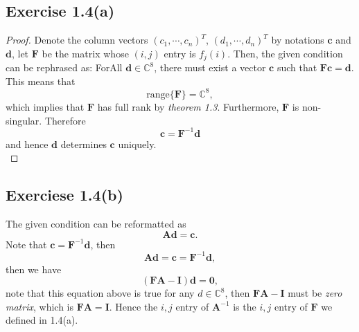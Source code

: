 \documentclass{article}
\begin{document}
    \subsection{Exercise 1.4(a)}
    \begin{proof}
    Denote the column vectors $(c_1, \cdots, c_n)^{T}$, $(d_1, \cdots, d_n)^{T}$ by notations $\bm{c}$ and $\bm{d}$, let $\bm{F}$ be the matrix whose $(i,j)$ entry is $f_j(i)$. Then, the given condition can be rephrased as: ForAll $\bm{d} \in \mathbb{C}^8$, there must exist a vector $\bm{c}$ such that $\bm{F} \bm{c} = \bm{d}$. This means that 
    $$
    \mathrm{range} \{\bm{F} \} = \mathbb{C}^8, 
    $$ 
    which implies that $\bm{F}$ has full rank by \textit{theorem 1.3}. Furthermore, $\mathbf{F}$ is non-singular. Therefore
    \[ \bm{c} = \bm{F}^{-1} \bm{d}\]
    and hence $\bm{d}$ determines $\bm{c}$ uniquely.\\
    \end{proof}

\subsection{Exerciese 1.4(b)}
    The given condition can be reformatted as
    $$
    \bm{A} \bm{d} = \bm{c}.
    $$
    Note that $\bm{c} = \bm{F}^{-1} \bm{d}$, then 
    $$
    \bm{A} \bm{d}  = \bm{c} = \bm{F}^{-1} \bm{d},
    $$
    then we have
    $$
    (\bm{FA} - \bm{I})\bm{d } = \bm{0}, 
    $$
    note that this equation above is true for any $d \in \mathbb{C}^{8}$, then $\bm{FA} - \bm{I}$ must be \textit{zero matrix}, which is $\bm{FA} = \bm{I}$. Hence the $i,j$ entry of $\bm{A}^{-1}$ is the $i,j$ entry of $\bm{F}$ we defined in 1.4(a).
\end{document}

